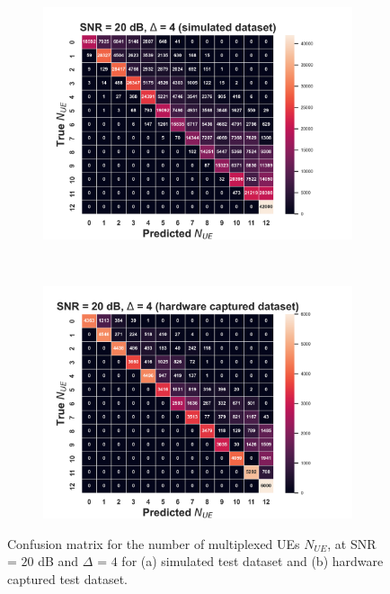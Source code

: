 \documentclass[journal]{IEEEtran}
\begin{document}
\begin{figure}[ht!]
    \captionsetup{justification=justified}
     \centering
     \begin{subfigure}[b]{0.48\textwidth}
         \centering
         \includegraphics[width=\textwidth]{Figures/Conf_mtx_num_UEs_SNR_20_dB_Max_off_4_train_sim_test_sim.png}
         \caption{}
         \label{fig: cm_num_UE_snr_20_off_4_sim}
     \end{subfigure}
     \\
     \begin{subfigure}[b]{0.48\textwidth}
         \centering
         \includegraphics[width=\textwidth]{Figures/Conf_mtx_num_UEs_SNR_20_dB_Max_off_4_train_sim_test_hw.png}
         \caption{}
         \label{fig: cm_num_UE_snr_20_off_4_hw}
     \end{subfigure}
        \caption{Confusion matrix for the number of multiplexed UEs $N_{UE}$, at SNR = $20$ dB and $\Delta$ = $4$ for (a) simulated test dataset and (b) hardware captured test dataset.}
        \label{fig: cm_num_UE_snr_20_off_4}
\end{figure}
\end{document}

